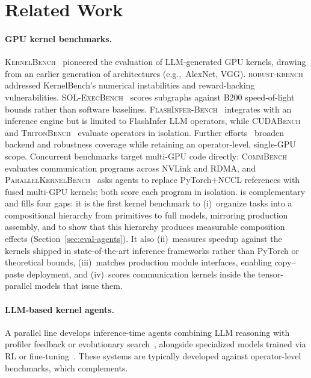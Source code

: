 \section{Related Work}
\label{sec:related}


\paragraph{GPU kernel benchmarks.}
\textsc{KernelBench}~\citep{kernelbench} pioneered the evaluation of LLM-generated GPU kernels, drawing from an earlier generation of architectures (e.g.,~AlexNet, VGG). \textsc{robust-kbench}~\citep{robustkbench} addressed KernelBench's numerical instabilities and reward-hacking vulnerabilities. 
\textsc{SOL-ExecBench}~\citep{solexecbench} scores subgraphs against B200 speed-of-light bounds rather than software baselines.
\textsc{FlashInfer-Bench}~\citep{flashinferbench} integrates with an inference engine but is limited to FlashInfer LLM operators, while \textsc{CUDABench}~\citep{cudabench} and \textsc{TritonBench}~\citep{tritonbench} evaluate operators in isolation.
Further efforts~\citep{backendbench,multikernelbench,kernelcraft,nvidia2025computeeval,kalade2025npueval} broaden backend and robustness coverage while retaining an operator-level, single-GPU scope.
Concurrent benchmarks target multi-GPU code directly: \textsc{CommBench}~\citep{commbench} evaluates communication programs across NVLink and RDMA, and \textsc{ParallelKernelBench}~\citep{parallelkernelbench} asks agents to replace PyTorch+NCCL references with fused multi-GPU kernels; both score each program in isolation.
\fastkernels{} is complementary and fills four gaps: it is the first kernel benchmark to (i)~organize tasks into a compositional hierarchy from primitives to full models, mirroring production assembly, and to show that this hierarchy produces measurable composition effects (Section~\ref{sec:eval-agents}). It also (ii)~measures speedup against the kernels shipped in state-of-the-art inference frameworks rather than PyTorch or theoretical bounds, (iii)~matches production module interfaces, enabling copy--paste deployment, and (iv)~scores communication kernels inside the tensor-parallel models that issue them.

\paragraph{LLM-based kernel agents.}
A parallel line develops inference-time agents combining LLM reasoning with profiler feedback or evolutionary search~\citep{robustkbench,kernelagent,kernelevolve,wei2025astra,cudaforge,wang2025geak,alphaevolve,openevolve,kda,ako}, alongside specialized models trained via RL or fine-tuning~\citep{baronio2025kevin,li2025cudal1,kernelllm2025,li2025autotriton,zhu2026qimeng}. These systems are typically developed against operator-level benchmarks, which \fastkernels{} complements.